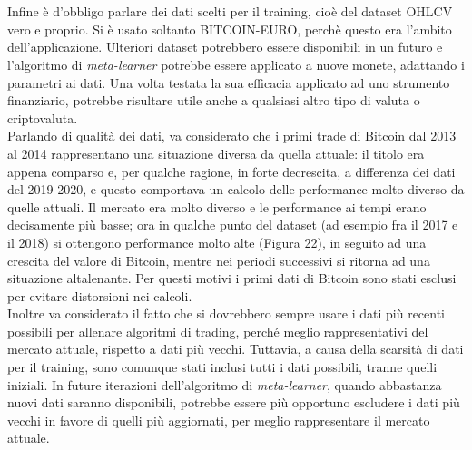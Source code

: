 \documentclass[a4paper,12pt]{report}
\begin{document}
\begin{fig}
\\~\\Infine è d'obbligo parlare dei dati scelti per il training, cioè del dataset OHLCV vero e proprio. Si è usato soltanto BITCOIN-EURO, perchè questo era l'ambito dell'applicazione. Ulteriori dataset potrebbero essere disponibili in un futuro e l'algoritmo di \textit{meta-learner} potrebbe essere applicato a nuove monete, adattando i parametri ai dati. Una volta testata la sua efficacia applicato ad uno strumento finanziario, potrebbe risultare utile anche a qualsiasi altro tipo di valuta o criptovaluta.\\ Parlando di qualità dei dati, va considerato che i primi trade di Bitcoin dal 2013 al 2014 rappresentano una situazione diversa da quella attuale: il titolo era appena comparso e, per qualche ragione, in forte decrescita, a differenza dei dati del 2019-2020, e questo comportava un calcolo delle performance molto diverso da quelle attuali. Il mercato era molto diverso e le performance ai tempi erano decisamente più basse; ora in qualche punto del dataset (ad esempio fra il 2017 e il 2018) si ottengono performance molto alte (Figura 22), in seguito ad una crescita del valore di Bitcoin, mentre nei periodi successivi si ritorna ad una situazione altalenante. Per questi motivi i primi dati di Bitcoin sono stati esclusi per evitare distorsioni nei calcoli.\\ Inoltre va considerato il fatto che si dovrebbero sempre usare i dati più recenti possibili per allenare algoritmi di trading, perché meglio rappresentativi del mercato attuale, rispetto a dati più vecchi. Tuttavia, a causa della scarsità di dati per il training, sono comunque stati inclusi tutti i dati possibili, tranne quelli iniziali. In future iterazioni dell'algoritmo di \textit{meta-learner}, quando abbastanza nuovi dati saranno disponibili, potrebbe essere più opportuno escludere i dati più vecchi in favore di quelli più aggiornati, per meglio rappresentare il mercato attuale.


\end{fig}
\end{document}
